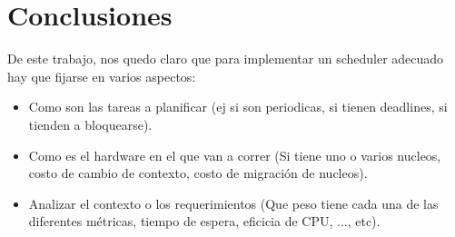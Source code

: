 \section{Conclusiones}

De este trabajo, nos quedo claro que para implementar un scheduler adecuado hay que fijarse en varios aspectos: \\

\begin{itemize}
	\item Como son las tareas a planificar (ej si son periodicas, si tienen deadlines, si tienden a bloquearse).
	\item Como es el hardware en el que van a correr (Si tiene uno o varios nucleos, costo de cambio de contexto, costo de migración de nucleos).
	\item Analizar el contexto o los requerimientos (Que peso tiene cada una de las diferentes métricas, tiempo de espera, eficicia de CPU, ..., etc).
\end{itemize}